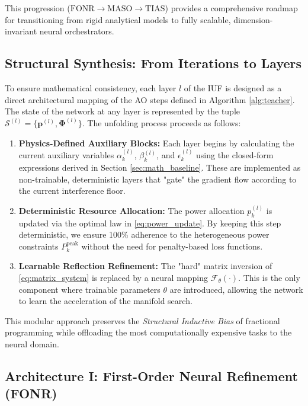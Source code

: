 \documentclass[journal]{IEEEtran}
\begin{document}
This progression ($\text{FONR} \rightarrow \text{MASO} \rightarrow \text{TIAS}$) provides a comprehensive roadmap for transitioning from rigid analytical models to fully scalable, dimension-invariant neural orchestrators.

\subsection{Structural Synthesis: From Iterations to Layers}
\label{subsec:synthesis}

To ensure mathematical consistency, each layer $l$ of the IUF is designed as a direct architectural mapping of the AO steps defined in Algorithm \ref{alg:teacher}. The state of the network at any layer is represented by the tuple $\mathcal{S}^{(l)} = \{ \mathbf{p}^{(l)}, \boldsymbol{\Phi}^{(l)} \}$. The unfolding process proceeds as follows:

\begin{enumerate}
    \item \textbf{Physics-Defined Auxiliary Blocks:} Each layer begins by calculating the current auxiliary variables $\alpha_k^{(l)}$, $\beta_k^{(l)}$, and $\epsilon_k^{(l)}$ using the closed-form expressions derived in Section \ref{sec:math_baseline}. These are implemented as non-trainable, deterministic layers that "gate" the gradient flow according to the current interference floor.
    \item \textbf{Deterministic Resource Allocation:} The power allocation $p_k^{(l)}$ is updated via the optimal law in \eqref{eq:power_update}. By keeping this step deterministic, we ensure 100\% adherence to the heterogeneous power constraints $P_k^{\text{peak}}$ without the need for penalty-based loss functions.
    \item \textbf{Learnable Reflection Refinement:} The "hard" matrix inversion of \eqref{eq:matrix_system} is replaced by a neural mapping $\mathcal{F}_{\theta}(\cdot)$. This is the only component where trainable parameters $\theta$ are introduced, allowing the network to learn the acceleration of the manifold search.
\end{enumerate}

This modular approach preserves the \textit{Structural Inductive Bias} of fractional programming while offloading the most computationally expensive tasks to the neural domain.

\subsection{Architecture I: First-Order Neural Refinement (FONR)}
\label{subsec:fonr}
\end{document}
